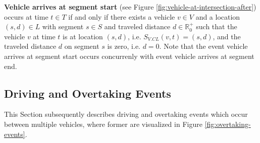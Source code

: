 \documentclass[graybox]{svmult}
\begin{document}
\vspace{4mm}
\noindent
\textbf{Vehicle arrives at segment start} (see Figure \ref{fig:vehicle-at-intersection-after})
occurs at time $t \in T$ if and only if there exists a vehicle $v \in V$ and a location $(s,d) \in L$ with segment $s \in S$ and traveled distance $d \in \mathbb{R}_0^+$ such that the vehicle $v$ at time $t$ is at location $(s,d)$, i.e. $S_{V.CL}(v,t) = (s,d)$, and the traveled distance $d$ on segment $s$ is zero, i.e. $d = 0$. Note that the event vehicle arrives at segment start occurs concurrenly with event vehicle arrives at segment end.
\vspace{-2mm}

\subsection{Driving and Overtaking Events}
\label{sec:overtaking-events}

This Section subsequently describes driving and overtaking events which occur between multiple vehicles, where former are visualized in Figure \ref{fig:overtaking-events}.
\end{document}
